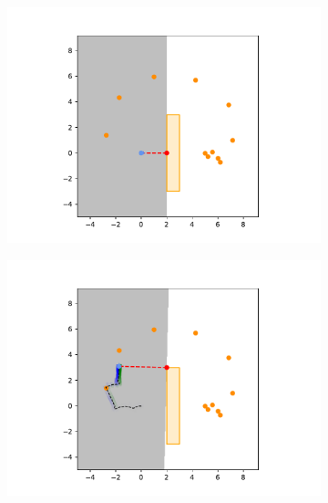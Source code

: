 \begin{figure}[H]
    \centering
    \begin{subfigure}{0.20\textwidth}
        \centering
        \includegraphics[width=\textwidth]{figures/Simulations/sim_rrt/frame_0.pdf}
    \end{subfigure}%
    \hfill
    \begin{subfigure}{0.20\textwidth}
        \centering
        \includegraphics[width=\textwidth]{figures/Simulations/sim_rrt/frame_2.pdf}
    \end{subfigure}%
    \hfill
    \begin{subfigure}{0.20\textwidth}
        \centering

\end{subfigure}
\end{figure}
